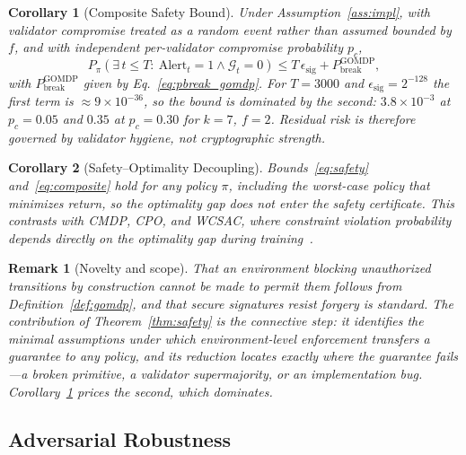 \documentclass[letterpaper]{article} %
\newtheorem{corollary}{Corollary}
\newtheorem{remark}{Remark}
\newcommand{\GOMDP}{\text{GOMDP}}
\newcommand{\Pbreak}{P_{\text{break}}}
\newcommand{\calG}{\mathcal{G}}
\begin{document}
\begin{corollary}[Composite Safety Bound]
\label{cor:composite}
Under Assumption~\ref{ass:impl}, with validator compromise treated as a random event rather than assumed bounded by $f$, and with independent per-validator compromise probability $p_c$,
\begin{equation}
P_\pi\!\left(\exists\, t\leq T:\ \mathrm{Alert}_t=1 \wedge \calG_t=0\right) \leq T\,\epsilon_{\mathrm{sig}} + \Pbreak^{\GOMDP},
\label{eq:composite}
\end{equation}
with $\Pbreak^{\GOMDP}$ given by Eq.~\eqref{eq:pbreak_gomdp}. For $T=3000$ and $\epsilon_{\mathrm{sig}}=2^{-128}$ the first term is $\approx 9\times 10^{-36}$, so the bound is dominated by the second: $3.8\times 10^{-3}$ at $p_c=0.05$ and $0.35$ at $p_c=0.30$ for $k=7$, $f=2$. Residual risk is therefore governed by validator hygiene, not cryptographic strength.
\end{corollary}

\begin{corollary}[Safety--Optimality Decoupling]
\label{cor:decoupling}
Bounds~\eqref{eq:safety} and~\eqref{eq:composite} hold for any policy $\pi$, including the worst-case policy that minimizes return, so the optimality gap does not enter the safety certificate. This contrasts with CMDP, CPO, and WCSAC, where constraint violation probability depends directly on the optimality gap during training~\citep{achiam2017,yang2021wcsac}.
\end{corollary}

\begin{remark}[Novelty and scope]
\label{rem:scope}
That an environment blocking unauthorized transitions by construction cannot be made to permit them follows from Definition~\ref{def:gomdp}, and that secure signatures resist forgery is standard. The contribution of Theorem~\ref{thm:safety} is the connective step: it identifies the minimal assumptions under which environment-level enforcement transfers a guarantee to \emph{any} policy, and its reduction locates exactly where the guarantee fails---a broken primitive, a validator supermajority, or an implementation bug. Corollary~\ref{cor:composite} prices the second, which dominates.
\end{remark}

\subsection{Adversarial Robustness}
\label{sec:theorem2}
\end{document}
